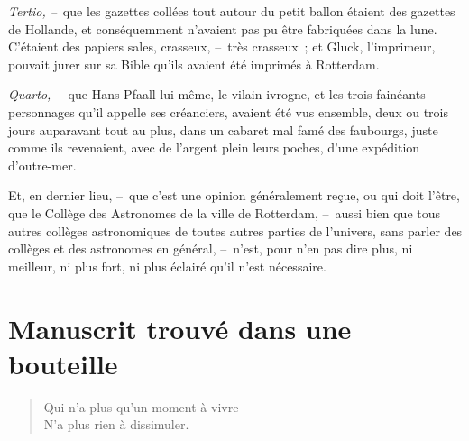 \documentclass[french,twoside]{book} %
\begin{document}
\emph{Tertio, –} que les gazettes collées tout autour du petit ballon étaient des gazettes de Hollande, et conséquemment n’avaient pas pu être fabriquées dans la lune. C’étaient des papiers sales, crasseux, – très crasseux ; et Gluck, l’imprimeur, pouvait jurer sur sa Bible qu’ils avaient été imprimés à Rotterdam.\par
\emph{Quarto, –} que Hans Pfaall lui-même, le vilain ivrogne, et les trois fainéants personnages qu’il appelle ses créanciers, avaient été vus ensemble, deux ou trois jours auparavant tout au plus, dans un cabaret mal famé des faubourgs, juste comme ils revenaient, avec de l’argent plein leurs poches, d’une expédition d’outre-mer.\par
Et, en dernier lieu, – que c’est une opinion généralement reçue, ou qui doit l’être, que le Collège des Astronomes de la ville de Rotterdam, – aussi bien que tous autres collèges astronomiques de toutes autres parties de l’univers, sans parler des collèges et des astronomes en général, – n’est, pour n’en pas dire plus, ni meilleur, ni plus fort, ni plus éclairé qu’il n’est nécessaire.
\section[{Manuscrit trouvé dans une bouteille}]{Manuscrit trouvé dans une bouteille}\renewcommand{\leftmark}{Manuscrit trouvé dans une bouteille}


\begin{verse}
Qui n’a plus qu’un moment à vivre\\
N’a plus rien à dissimuler.\\
\end{verse}
\end{document}
